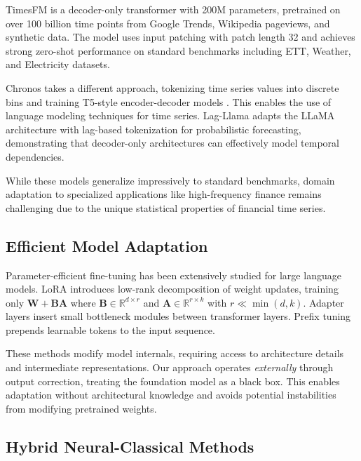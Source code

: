 \documentclass[10pt,conference]{IEEEtran}
\begin{document}
TimesFM \cite{das2024decoder} is a decoder-only transformer with 200M parameters, pretrained on over 100 billion time points from Google Trends, Wikipedia pageviews, and synthetic data. The model uses input patching with patch length 32 and achieves strong zero-shot performance on standard benchmarks including ETT, Weather, and Electricity datasets.

Chronos \cite{ansari2024chronos} takes a different approach, tokenizing time series values into discrete bins and training T5-style encoder-decoder models \cite{raffel2020exploring}. This enables the use of language modeling techniques for time series. Lag-Llama \cite{rasul2024lagllama} adapts the LLaMA architecture with lag-based tokenization for probabilistic forecasting, demonstrating that decoder-only architectures can effectively model temporal dependencies.

While these models generalize impressively to standard benchmarks, domain adaptation to specialized applications like high-frequency finance remains challenging due to the unique statistical properties of financial time series.

\subsection{Efficient Model Adaptation}

Parameter-efficient fine-tuning has been extensively studied for large language models. LoRA \cite{hu2022lora} introduces low-rank decomposition of weight updates, training only $\mathbf{W} + \mathbf{BA}$ where $\mathbf{B} \in \mathbb{R}^{d \times r}$ and $\mathbf{A} \in \mathbb{R}^{r \times k}$ with $r \ll \min(d,k)$. Adapter layers \cite{houlsby2019parameter} insert small bottleneck modules between transformer layers. Prefix tuning \cite{li2021prefix} prepends learnable tokens to the input sequence.

These methods modify model internals, requiring access to architecture details and intermediate representations. Our approach operates \textit{externally} through output correction, treating the foundation model as a black box. This enables adaptation without architectural knowledge and avoids potential instabilities from modifying pretrained weights.

\subsection{Hybrid Neural-Classical Methods}
\end{document}
